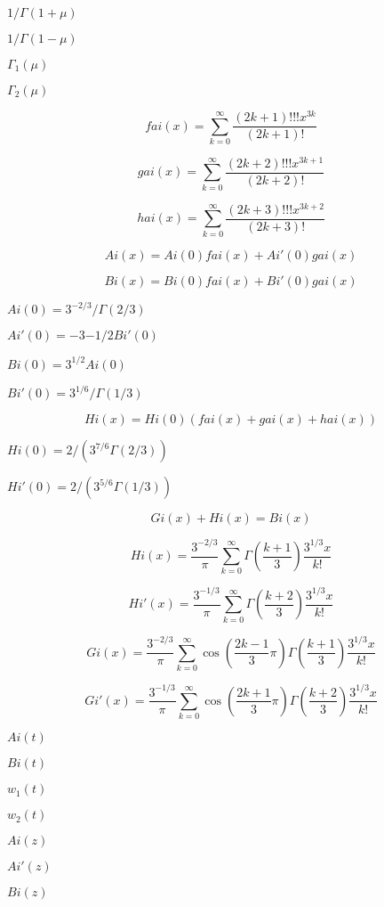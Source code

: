 \documentclass{article}
\begin{document}
$ 1/\Gamma(1 + \mu) $
\pagebreak

$ 1/\Gamma(1 - \mu) $
\pagebreak

$ \Gamma_1(\mu) $
\pagebreak

$ \Gamma_2(\mu) $
\pagebreak

\[ fai(x) = \sum_{k=0}^\infty \frac{(2k+1)!!!x^{3k}}{(2k+1)!} \]
\pagebreak

\[ gai(x) = \sum_{k=0}^\infty \frac{(2k+2)!!!x^{3k+1}}{(2k+2)!} \]
\pagebreak

\[ hai(x) = \sum_{k=0}^\infty \frac{(2k+3)!!!x^{3k+2}}{(2k+3)!} \]
\pagebreak

\[ Ai(x) = Ai(0)fai(x) + Ai'(0)gai(x) \]
\pagebreak

\[ Bi(x) = Bi(0)fai(x) + Bi'(0)gai(x) \]
\pagebreak

$ Ai(0) = 3^{-2/3}/\Gamma(2/3) $
\pagebreak

$ Ai'(0) = -3{-1/2}Bi'(0) $
\pagebreak

$ Bi(0) = 3^{1/2}Ai(0) $
\pagebreak

$ Bi'(0) = 3^{1/6}/\Gamma(1/3) $
\pagebreak

\[ Hi(x) = Hi(0)\left(fai(x) + gai(x) + hai(x)\right) \]
\pagebreak

$ Hi(0) = 2/(3^{7/6}\Gamma(2/3)) $
\pagebreak

$ Hi'(0) = 2/(3^{5/6}\Gamma(1/3)) $
\pagebreak

\[ Gi(x) + Hi(x) = Bi(x) \]
\pagebreak

\[ Hi(x) = \frac{3^{-2/3}}{\pi} \sum_{k=0}^\infty \Gamma\left(\frac{k+1}{3}\right) \frac{3^{1/3}x}{k!} \]
\pagebreak

\[ Hi'(x) = \frac{3^{-1/3}}{\pi} \sum_{k=0}^\infty \Gamma\left(\frac{k+2}{3}\right) \frac{3^{1/3}x}{k!} \]
\pagebreak

\[ Gi(x) = \frac{3^{-2/3}}{\pi} \sum_{k=0}^\infty \cos\left(\frac{2k-1}{3}\pi\right) \Gamma\left(\frac{k+1}{3}\right) \frac{3^{1/3}x}{k!} \]
\pagebreak

\[ Gi'(x) = \frac{3^{-1/3}}{\pi} \sum_{k=0}^\infty \cos\left(\frac{2k+1}{3}\pi\right) \Gamma\left(\frac{k+2}{3}\right) \frac{3^{1/3}x}{k!} \]
\pagebreak

$ Ai(t) $
\pagebreak

$ Bi(t) $
\pagebreak

$ w_1(t) $
\pagebreak

$ w_2(t) $
\pagebreak

$ Ai(z) $
\pagebreak

$ Ai'(z) $
\pagebreak

$ Bi(z) $
\pagebreak
\end{document}
